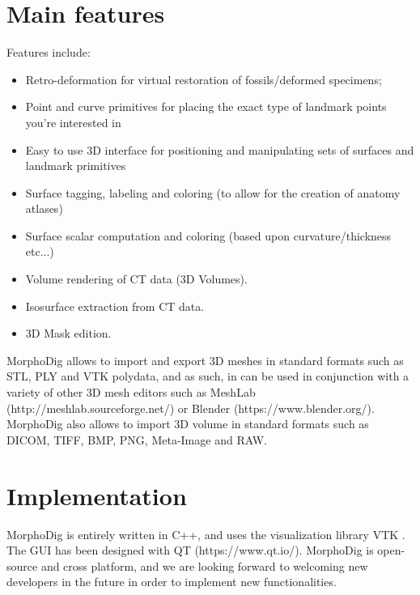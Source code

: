\documentclass[12pt, a4paper]{book}
\begin{document}
\section*{Main features}
Features include:
\begin{itemize}
\item Retro-deformation for virtual restoration of fossils/deformed specimens;
\item Point and curve primitives for placing the exact type of landmark points you’re interested in
\item Easy to use 3D interface for positioning and manipulating sets of surfaces and landmark primitives
\item Surface tagging, labeling and coloring (to allow for the creation of anatomy atlases)
\item Surface scalar computation and coloring (based upon curvature/thickness etc...)
\item Volume rendering of CT data (3D Volumes).
\item Isosurface extraction from  CT data.
\item 3D Mask edition.
\end{itemize}

MorphoDig allows to import and export 3D meshes in standard formats such as STL, PLY and VTK polydata, and as such, in can be used in conjunction with a variety of other 3D mesh editors such  as MeshLab (http://meshlab.sourceforge.net/) or Blender (https://www.blender.org/). MorphoDig also allows to import 3D volume in standard formats such as DICOM, TIFF, BMP, PNG, Meta-Image and RAW.
\section*{Implementation}
MorphoDig is entirely written in C++, and uses the visualization library VTK \citep{Avila2001}. The GUI has been designed with QT (https://www.qt.io/). MorphoDig is open-source and cross platform, and we are looking forward to welcoming new developers in the future in order to implement new functionalities. 


		 
		 		 
     
		 
	   
		 
		 
		 
		 
		 
		 
		 
		
		
		 
		 
		 

\cleardoublepage
{}

  		
\end{document}
